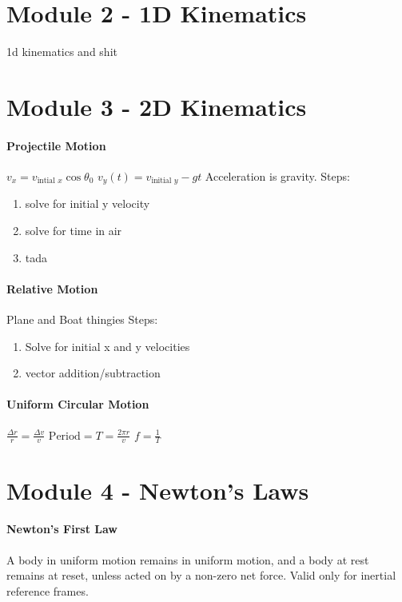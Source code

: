 \documentclass[10pt,letter]{article}
\begin{document}
\pagebreak
\section*{Module 2 - 1D Kinematics}
1d kinematics and shit

\pagebreak

\section*{Module 3 - 2D Kinematics}

\paragraph{Projectile Motion} 
$v_x=v_{\text{intial }x}\cos\theta_0$ \quad $v_y(t) = v_{\text{initial }y}-gt$ Acceleration is gravity. Steps: \begin{enumerate}
    \item solve for initial y velocity
    \item solve for time in air
    \item tada
\end{enumerate}

\paragraph{Relative Motion} 
Plane and Boat thingies Steps: 
\begin{enumerate}
    \item Solve for initial x and y velocities
    \item vector addition/subtraction
\end{enumerate}

\paragraph{Uniform Circular Motion} 
$\frac{\Delta r}{r} = \frac{\Delta v}{v}$ \quad $\text{Period} = T = \frac{2\pi r}{v}$ \quad $f = \frac{1}{T}$

\pagebreak
\section*{Module 4 - Newton's Laws}
\paragraph{Newton's First Law} A body in uniform motion remains in uniform motion, and a body at rest remains at reset, unless acted on by a non-zero net force. Valid only for inertial reference frames. 
\end{document}
